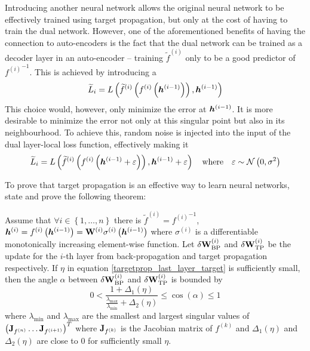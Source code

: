 Introducing another neural network allows the original neural network to be effectively trained using target propagation, but only at the cost of having to train the dual network. However, one of the aforementioned benefits of having the connection to auto-encoders is the fact that the dual network can be trained as a decoder layer in an auto-encoder -- training \( \widetilde{f}^{(i)} \) only to be a good predictor of \( {f^{(i)}}^{-1} \). This is achieved by introducing a 
\[ \widetilde{L}_i = L \left( \widetilde{f}^{(i)} \left( f^{(i)} \left( \bm{h}^{(i - 1)} \right) \right), \bm{h}^{(i - 1)} \right) \]
This choice would, however, only minimize the error at \( \bm{h}^{(i - 1)} \). It is more desirable to minimize the error not only at this singular point but also in its neighbourhood. To achieve this, random noise is injected into the input of the dual layer-local loss function, effectively making it
\[ \widetilde{L}_i = L \left( \widetilde{f}^{(i)} \left( f^{(i)} \left( \bm{h}^{(i - 1)} + \varepsilon \right) \right), \bm{h}^{(i - 1)} + \varepsilon \right) \quad \text{where} \quad \varepsilon \sim \mathcal{N} \left( 0, \sigma^2 \right) \]

To prove that target propagation is an effective way to learn neural networks, \cite{lee_difference_2015} state and prove the following theorem:

\begin{theorem}
	Assume that \( \forall i \in \left\{ 1, \dots, n \right\} \) there is \( \widetilde{f}^{(i)} = {f^{(i)}}^{-1} \), \( \bm{h}^{(i)} = f^{(i)} \left( \bm{h}^{(i - 1)} \right) = \mathbf{W}^{(i)} \sigma^{(i)} \left( \bm{h}^{(i - 1)} \right) \) where \( \sigma^{(i)} \) is a differentiable monotonically increasing element-wise function. Let \( \delta \mathbf{W}^{(i)}_{\mathrm{BP}} \) and \( \delta \mathbf{W}^{(i)}_{\mathrm{TP}} \) be the update for the \( i \)-th layer from back-propagation and target propagation respectively. If \( \eta \) in equation \ref{targetprop_last_layer_target} is sufficiently small, then the angle \( \alpha \) between \( \delta \mathbf{W}^{(i)}_{\mathrm{BP}} \) and \( \delta \mathbf{W}^{(i)}_{\mathrm{TP}} \) is bounded by
	\[ 0 < \frac{1 + \Delta_1 \left( \eta \right)}{\frac{\lambda_{\mathrm{max}}}{\lambda_{\mathrm{min}}} + \Delta_2 \left( \eta \right)} \leq \cos \left( \alpha \right) \leq 1 \]
		where \( \lambda_{\mathrm{min}} \) and \( \lambda_{\mathrm{max}} \) are the smallest and largest singular values of \( \left( \mathbf{J}_{f^{(n)}} \dots \mathbf{J}_{f^{(i + 1)}} \right)^T \) where \( \mathbf{J}_{f^{(k)}} \) is the Jacobian matrix of \( f^{(k)} \) and \( \Delta_1 \left( \eta \right) \) and \( \Delta_2 \left( \eta \right) \) are close to \( 0 \) for sufficiently small \( \eta \).
\end{theorem}

